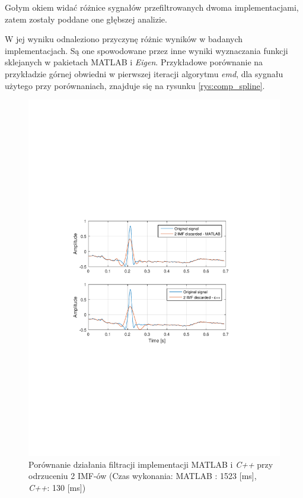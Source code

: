 Gołym okiem widać różnice sygnałów przefiltrowanych dwoma implementacjami, zatem
zostały poddane one głębszej analizie.

W jej wyniku odnaleziono przyczynę różnic
wyników w badanych implementacjach. Są one spowodowane przez inne wyniki
wyznaczania funkcji sklejanych w pakietach \textrm{MATLAB} i \textit{Eigen}.
Przykładowe porównanie na przykładzie górnej obwiedni w pierwszej iteracji
algorytmu \textit{emd}, dla sygnału użytego przy porównaniach, znajduje się na
rysunku \ref{rys:comp_spline}.

\newpage

\begin{figure}[!htb]
    \begin{center}
        \includegraphics[width=13cm,trim=4cm 9.5cm 4cm 10cm,clip]
        {../img/mat_cpp_domp_d2.pdf}
    \end{center}
    \caption{Porównanie działania filtracji implementacji \textrm{MATLAB} i
    \textit{C++} przy odrzuceniu 2 IMF-ów (Czas wykonania: \textrm{MATLAB} :
    1523 [ms], \textit{C++}: 130 [ms])}
    \label{rys:comp_d2}
\end{figure}

